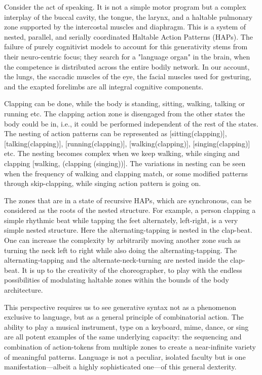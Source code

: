Consider the act of speaking. It is not a simple motor program but a complex interplay of the buccal cavity, the tongue, the larynx, and a haltable pulmonary zone supported by the intercostal muscles and diaphragm. This is a system of nested, parallel, and serially coordinated Haltable Action Patterns (HAPs). The failure of purely cognitivist models to account for this generativity stems from their neuro-centric focus; they search for a "language organ" in the brain, when the competence is distributed across the entire bodily network. In our account, the lungs, the saccadic muscles of the eye, the facial muscles used for gesturing, and the exapted forelimbs are all integral cognitive components.

Clapping can be done, while the body is standing, sitting, walking, talking or running etc. The clapping action zone is disengaged from the other states the body could be in, i.e., it could be performed independent of the rest of the states. The nesting of action patterns can be represented as [sitting(clapping)], [talking(clapping)], [running(clapping)], [walking(clapping)], [singing(clapping)] etc. The nesting becomes complex when we keep walking, while singing and clapping [walking, (clapping (singing))]. The variations in nesting can be seen when the frequency of walking and clapping match, or some modified patterns through skip-clapping, while singing action pattern is going on.

The zones that are in a state of recursive HAPs, which are synchronous, can be considered as the roots of the nested structure. For example, a person clapping a simple rhythmic beat while tapping the feet alternately, left-right, is a very simple nested structure. Here the alternating-tapping is nested in the clap-beat. One can increase the complexity by arbitrarily moving another zone such as turning the neck left to right while also doing the alternating-tapping. The alternating-tapping and the alternate-neck-turning are nested inside the clap-beat. It is up to the creativity of the choreographer, to play with the endless possibilities of modulating haltable zones within the bounds of the body architecture.

This perspective requires us to see generative syntax not as a phenomenon exclusive to language, but as a general principle of combinatorial action. The ability to play a musical instrument, type on a keyboard, mime, dance, or sing are all potent examples of the same underlying capacity: the sequencing and combination of action-tokens from multiple zones to create a near-infinite variety of meaningful patterns. Language is not a peculiar, isolated faculty but is one manifestation—albeit a highly sophisticated one—of this general dexterity.

